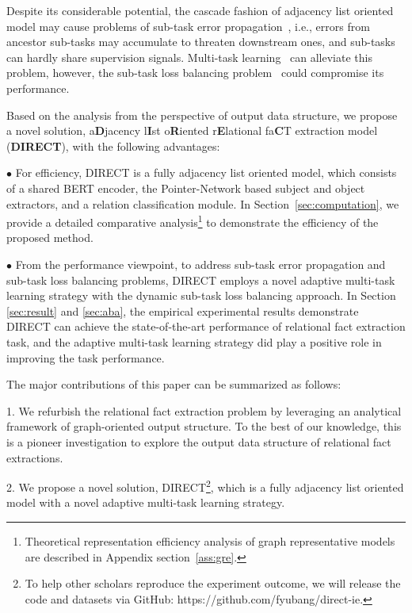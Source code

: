 \documentclass[11pt,a4paper]{article}
\begin{document}
Despite its considerable potential, the cascade fashion of adjacency list oriented model may cause problems of sub-task error propagation~\cite{shen2019multi}, i.e., errors from ancestor sub-tasks may accumulate to threaten downstream ones, and sub-tasks can hardly share supervision signals. Multi-task learning~\cite{caruana1997multitask} can alleviate this problem, however, the sub-task loss balancing problem~\cite{chen2018gradnorm,sener2018multi} could compromise its performance.

Based on the analysis from the perspective of output data structure, we propose a novel solution, a\textbf{D}jacency l\textbf{I}st o\textbf{R}iented r\textbf{E}lational fa\textbf{C}T extraction model (\textbf{DIRECT}), with the following advantages:

$\bullet$ For efficiency, DIRECT is a fully adjacency list oriented model, which consists of a shared BERT encoder, the Pointer-Network based subject and object extractors, and a relation classification module. In Section~\ref{sec:computation}, we provide a detailed comparative analysis\footnote{Theoretical representation efficiency analysis of graph representative models are described in Appendix section~\ref{ass:gre}.} to demonstrate the efficiency of the proposed method.

$\bullet$ From the performance viewpoint, to address sub-task error propagation and sub-task loss balancing problems, DIRECT employs a novel adaptive multi-task learning strategy with the dynamic sub-task loss balancing approach. In Section \ref{sec:result} and \ref{sec:aba}, the empirical experimental results demonstrate DIRECT can achieve the state-of-the-art performance of relational fact extraction task, and the adaptive multi-task learning strategy did play a positive role in improving the task performance.

The major contributions of this paper can be summarized as follows: 

1. We refurbish the relational fact extraction problem by leveraging an 
analytical framework of graph-oriented output structure. To the best of our knowledge, this is a pioneer investigation to explore the output data structure of relational fact extractions.

2. We propose a novel solution, DIRECT\footnote{To help other scholars reproduce the experiment outcome, we will release the code and datasets via GitHub: https://github.com/fyubang/direct-ie.\label{ft:code}}, which is a fully adjacency list oriented model with a novel adaptive multi-task learning strategy.
\end{document}
